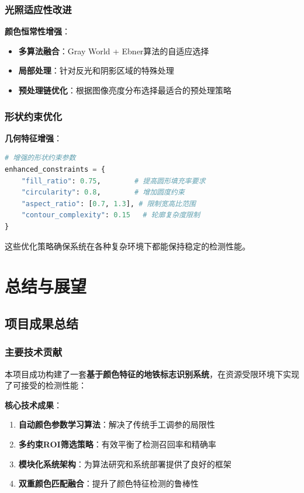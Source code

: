 \documentclass[12pt,a4paper]{article}
\begin{document}
\subsubsection{光照适应性改进}

\textbf{颜色恒常性增强}：
\begin{itemize}
    \item \textbf{多算法融合}：Gray World + Ebner算法的自适应选择
    \item \textbf{局部处理}：针对反光和阴影区域的特殊处理
    \item \textbf{预处理链优化}：根据图像亮度分布选择最适合的预处理策略
\end{itemize}

\subsubsection{形状约束优化}

\textbf{几何特征增强}：
\begin{lstlisting}[language=Python]
# 增强的形状约束参数
enhanced_constraints = {
    "fill_ratio": 0.75,        # 提高圆形填充率要求
    "circularity": 0.8,        # 增加圆度约束
    "aspect_ratio": [0.7, 1.3], # 限制宽高比范围
    "contour_complexity": 0.15   # 轮廓复杂度限制
}
\end{lstlisting}

这些优化策略确保系统在各种复杂环境下都能保持稳定的检测性能。

\section{总结与展望}

\subsection{项目成果总结}

\subsubsection{主要技术贡献}

本项目成功构建了一套\textbf{基于颜色特征的地铁标志识别系统}，在资源受限环境下实现了可接受的检测性能：

\textbf{核心技术成果}：
\begin{enumerate}
    \item \textbf{自动颜色参数学习算法}：解决了传统手工调参的局限性
    \item \textbf{多约束ROI筛选策略}：有效平衡了检测召回率和精确率
    \item \textbf{模块化系统架构}：为算法研究和系统部署提供了良好的框架
    \item \textbf{双重颜色匹配融合}：提升了颜色特征检测的鲁棒性
\end{enumerate}
\end{document}
